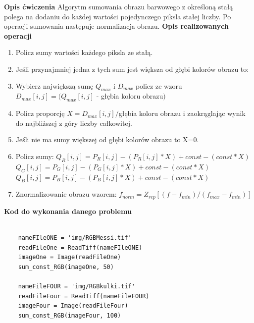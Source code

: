 \documentclass[magisterska,openany]{pracadypl}
\begin{document}
\vspace{0.5cm}\textbf{\Large Opis ćwiczenia}
\vspace{0.25cm}\newline
Algorytm sumowania obrazu barwowego z określoną stałą polega na dodaniu do każdej
wartości
pojedynczego piksla stałej liczby. Po operacji sumowania następuje normalizacja
obrazu.
\newline
\newline
\textbf{\Large Opis realizowanych operacji}
\begin{enumerate}
\item Policz sumy wartości każdego piksla ze stałą.
\item Jeśli przynajmniej jedna z tych sum jest większa od głębi kolorów obrazu to:
\item Wybierz największą sumę $Q_{max}$ i $D_{max}$ policz ze wzoru
\newline $D_{max}[i,j]=(Q_{max}[i,j]$ - głębia koloru obrazu$)$
\item Policz proporcję $X=D_{max}[i,j]/$głębia koloru obrazu 
\newline i zaokrąglając wynik do najbliższej z góry liczby całkowitej.
\item Jeśli nie ma sumy większej od głębi kolorów obrazu to X=0.
\item Policz sumy: 
\newline $Q_R[i,j]=P_R[i,j]-(P_R[i,j]*X)+const-(const*X)$
\newline $Q_G[i,j]=P_G[i,j]-(P_G[i,j]*X)+const-(const*X)$
\newline $Q_B[i,j]=P_B[i,j]-(P_B[i,j]*X)+const-(const*X)$
\item Znormalizowanie obrazu wzorem:
\newline $f_{norm}=Z_{rep}[(f-f_{min})/(f_{max}-f_{min})]$
\end{enumerate}

\newpage
\vspace{0.5cm}
\textbf{\Large Kod do wykonania danego problemu}
\lstset{language=Python}
\vspace{0.25cm}
\begin{lstlisting}

	nameFIleONE = 'img/RGBMessi.tif'
	readFileOne = ReadTiff(nameFIleONE)
	imageOne = Image(readFileOne)
	sum_const_RGB(imageOne, 50)
	
	nameFileFOUR = 'img/RGBkulki.tif'
	readFileFour = ReadTiff(nameFileFOUR)
	imageFour = Image(readFileFour)
	sum_const_RGB(imageFour, 100)

\end{lstlisting}
\end{document}
